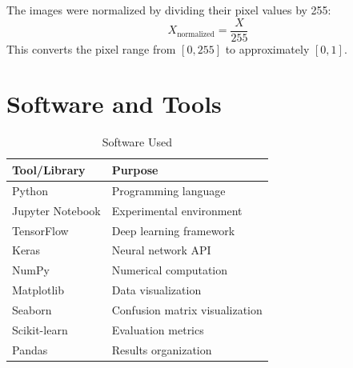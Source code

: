 \documentclass[11pt]{article}
\begin{document}
The images were normalized by dividing their pixel values by 255:
\[
X_{\text{normalized}} = \frac{X}{255}
\]
This converts the pixel range from $[0, 255]$ to approximately $[0, 1]$.

\section{Software and Tools}
\begin{table}[h]
\centering
\caption{Software Used}
\begin{tabular}{|l|l|}
\hline
\textbf{Tool/Library} & \textbf{Purpose} \\
\hline
Python & Programming language \\
Jupyter Notebook & Experimental environment \\
TensorFlow & Deep learning framework \\
Keras & Neural network API \\
NumPy & Numerical computation \\
Matplotlib & Data visualization \\
Seaborn & Confusion matrix visualization \\
Scikit-learn & Evaluation metrics \\
Pandas & Results organization \\
\hline
\end{tabular}
\end{table}

\end{document}
